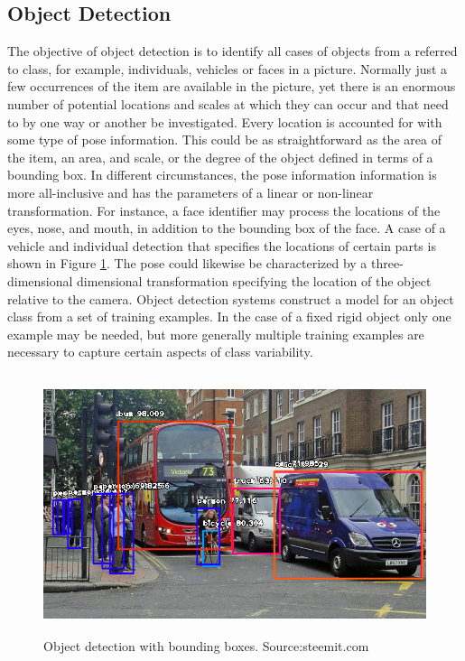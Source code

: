 \subsection{Object Detection}
 The objective of object detection is to identify all cases of objects from a referred to class, for example, individuals, vehicles or faces in a picture. Normally just a few occurrences of the item are available in the picture, yet there is an enormous number of potential locations and scales at which they can occur and that need to by one way or another be investigated. 
 Every location is accounted for with some type of pose information. This could be as straightforward as the area of the item, an area, and scale, or the degree of the object defined in terms of a bounding box. In different circumstances, the pose information information is more all-inclusive and has the parameters of a linear or non-linear transformation. For instance, a face identifier may process the locations of the eyes, nose, and mouth, in addition to the bounding box of the face. A case of a vehicle and individual detection that specifies the locations of certain parts is shown in Figure \ref{fig:objectD}. The pose could likewise be characterized by a three-dimensional dimensional transformation specifying the location of the object relative to the camera. 
Object detection systems construct a model for an object class from a set of training examples. In the case of a
fixed rigid object only one example may be needed, but more generally multiple training examples are
necessary to capture certain aspects of class variability.


\begin{figure}[H]
  \centering
  \includegraphics[height=3in]{images/object_det.jpeg}
   \caption{Object detection with bounding boxes. Source:steemit.com}
   \label{fig:objectD}
\end{figure}

